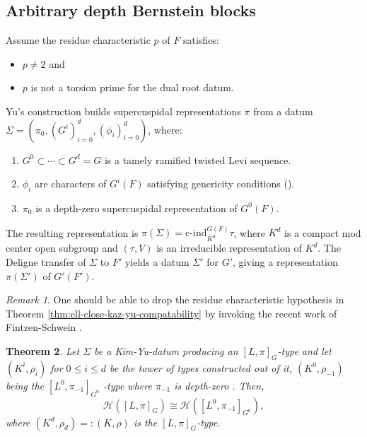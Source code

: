 \documentclass[american]{article}
\numberwithin{equation}{section}
\numberwithin{figure}{section}
\theoremstyle{plain}
\newtheorem{theorem}{Theorem}[section]
\theoremstyle{definition}
\theoremstyle{remark}
\newtheorem{remark}[theorem]{Remark}
\begin{document}
\subsection{Arbitrary depth Bernstein blocks}
Assume the residue characteristic \(p\) of $F$ satisfies:
\begin{itemize}
    \item \(p \neq 2\) and
    \item \(p \) is not a torsion prime for the dual root datum. 
\end{itemize}
Yu's construction \cite{Yu2001} builds supercuspidal representations $\pi$ from a datum $\Sigma = (\pi_0, (G^i)_{i=0}^d, (\phi_i)_{i=0}^d)$, where:
\begin{enumerate}
\item $G^0 \subset \cdots \subset G^d = G$ is a tamely ramified twisted Levi sequence.
\item $\phi_i$ are characters of $G^i(F)$ satisfying genericity conditions (\cite[\S 8]{Yu2001}).
\item  $\pi_0$ is a depth-zero supercuspidal representation of $G^0(F)$.
\end{enumerate}
The resulting representation is $\pi(\Sigma) = \mathrm{c\text{-}ind}_{K^d}^{G(F)} \tau$, where $K^d$ is a compact mod center open subgroup and $(\tau,V)  $ is an irreducible representation of $K^d$. The Deligne transfer of $\Sigma$ to $F'$ yields a datum $\Sigma'$ for $G'$, giving a representation $\pi(\Sigma')$ of $G'(F')$.
\begin{remark}
    One should be able to drop the residue characteristic hypothesis in Theorem \ref{thm:ell-close-kaz-yu-compatability} by invoking the recent work of Fintzen-Schwein \cite{FS2025}.
\end{remark}
\begin{theorem}\cite[Theorem 4.4.1]{AFMO24b}\label{thm:AFMO24b}
Let $\Sigma$ be a Kim-Yu-datum producing an $[L,\pi]_G$-type and let $(K^i,\rho_i)$ for $0\leq i\leq d$ be the tower of types constructed out of it, $(K^0,\rho_{-1})$ being the  $[L^0,\pi_{-1}]_{G^0}$ -type where $\pi_{-1}$ is depth-zero . Then,
\[
\mathcal{H}([L,\pi]_G)\cong \mathcal{H}([L^0,\pi_{-1}]_{G^0}),  
\]
where $(K^d,\rho_d)=:(K,\rho)$ is the $[L,\pi]_G$-type.
\end{theorem}
\end{document}
